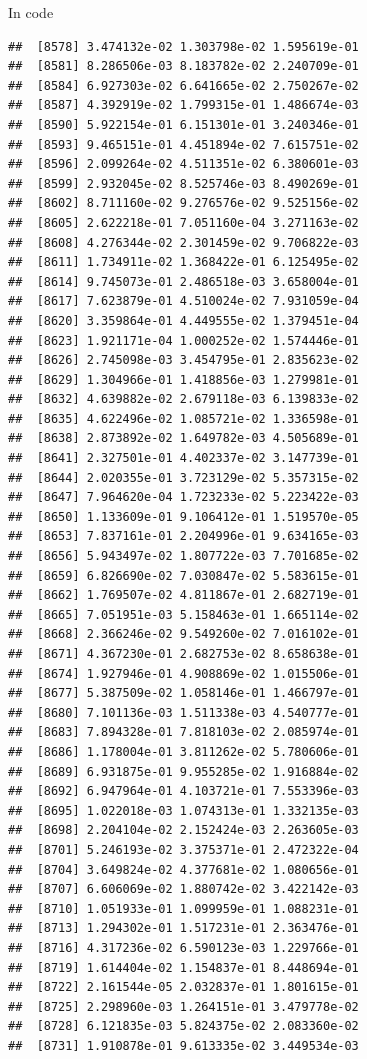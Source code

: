 \documentclass[ignorenonframetext,]{beamer}
\begin{document}
\begin{frame}[fragile]{In code}
\begin{verbatim}
##  [8578] 3.474132e-02 1.303798e-02 1.595619e-01
##  [8581] 8.286506e-03 8.183782e-02 2.240709e-01
##  [8584] 6.927303e-02 6.641665e-02 2.750267e-02
##  [8587] 4.392919e-02 1.799315e-01 1.486674e-03
##  [8590] 5.922154e-01 6.151301e-01 3.240346e-01
##  [8593] 9.465151e-01 4.451894e-02 7.615751e-02
##  [8596] 2.099264e-02 4.511351e-02 6.380601e-03
##  [8599] 2.932045e-02 8.525746e-03 8.490269e-01
##  [8602] 8.711160e-02 9.276576e-02 9.525156e-02
##  [8605] 2.622218e-01 7.051160e-04 3.271163e-02
##  [8608] 4.276344e-02 2.301459e-02 9.706822e-03
##  [8611] 1.734911e-02 1.368422e-01 6.125495e-02
##  [8614] 9.745073e-01 2.486518e-03 3.658004e-01
##  [8617] 7.623879e-01 4.510024e-02 7.931059e-04
##  [8620] 3.359864e-01 4.449555e-02 1.379451e-04
##  [8623] 1.921171e-04 1.000252e-02 1.574446e-01
##  [8626] 2.745098e-03 3.454795e-01 2.835623e-02
##  [8629] 1.304966e-01 1.418856e-03 1.279981e-01
##  [8632] 4.639882e-02 2.679118e-03 6.139833e-02
##  [8635] 4.622496e-02 1.085721e-02 1.336598e-01
##  [8638] 2.873892e-02 1.649782e-03 4.505689e-01
##  [8641] 2.327501e-01 4.402337e-02 3.147739e-01
##  [8644] 2.020355e-01 3.723129e-02 5.357315e-02
##  [8647] 7.964620e-04 1.723233e-02 5.223422e-03
##  [8650] 1.133609e-01 9.106412e-01 1.519570e-05
##  [8653] 7.837161e-01 2.204996e-01 9.634165e-03
##  [8656] 5.943497e-02 1.807722e-03 7.701685e-02
##  [8659] 6.826690e-02 7.030847e-02 5.583615e-01
##  [8662] 1.769507e-02 4.811867e-01 2.682719e-01
##  [8665] 7.051951e-03 5.158463e-01 1.665114e-02
##  [8668] 2.366246e-02 9.549260e-02 7.016102e-01
##  [8671] 4.367230e-01 2.682753e-02 8.658638e-01
##  [8674] 1.927946e-01 4.908869e-02 1.015506e-01
##  [8677] 5.387509e-02 1.058146e-01 1.466797e-01
##  [8680] 7.101136e-03 1.511338e-03 4.540777e-01
##  [8683] 7.894328e-01 7.818103e-02 2.085974e-01
##  [8686] 1.178004e-01 3.811262e-02 5.780606e-01
##  [8689] 6.931875e-01 9.955285e-02 1.916884e-02
##  [8692] 6.947964e-01 4.103721e-01 7.553396e-03
##  [8695] 1.022018e-03 1.074313e-01 1.332135e-03
##  [8698] 2.204104e-02 2.152424e-03 2.263605e-03
##  [8701] 5.246193e-02 3.375371e-01 2.472322e-04
##  [8704] 3.649824e-02 4.377681e-02 1.080656e-01
##  [8707] 6.606069e-02 1.880742e-02 3.422142e-03
##  [8710] 1.051933e-01 1.099959e-01 1.088231e-01
##  [8713] 1.294302e-01 1.517231e-01 2.363476e-01
##  [8716] 4.317236e-02 6.590123e-03 1.229766e-01
##  [8719] 1.614404e-02 1.154837e-01 8.448694e-01
##  [8722] 2.161544e-05 2.032837e-01 1.801615e-01
##  [8725] 2.298960e-03 1.264151e-01 3.479778e-02
##  [8728] 6.121835e-03 5.824375e-02 2.083360e-02
##  [8731] 1.910878e-01 9.613335e-02 3.449534e-03

\end{verbatim}
\end{frame}
\end{document}
